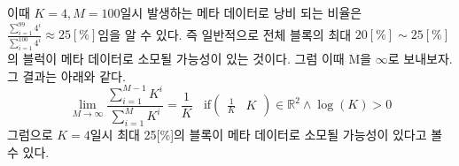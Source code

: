 \documentclass{book}
\begin{document}
\newline\newline
이때 $K=4, M=100$일시 발생하는 메타 데이터로 낭비 되는 비율은 $\frac{\sum_{i=1}^{99} 4^i}{\sum_{i=1}^{100} 4^i} \approx 25[\%]$임을 알 수 있다.
\newline\newline
즉 일반적으로 전체 블록의 최대 $20[\%] \sim 25[\%]$의 블럭이 메타 데이터로 소모될 가능성이 있는 것이다.
\newline\newline
그럼 이때 M을 $\infty$로 보내보자. 그 결과는 아래와 같다.
\[
\lim_{M \to \infty}{ \frac{\sum_{i=1}^{M-1} K^i}{\sum_{i=1}^M K^i} }=\frac{1}{K}~~~~\text{if} \begin{pmatrix} \frac{1}{K} & K \end{pmatrix} \in \mathbb{R}^2 \land \log(K) > 0
\]
그럼으로 $K=4$일시 최대 25[\%]의 블록이 메타 데이터로 소모될 가능성이 있다고 볼 수 있다.
\end{document}
